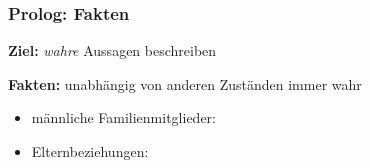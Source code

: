 \documentclass{beamer}
\begin{document}
\begin{frame}[fragile] \frametitle{Prolog: Fakten}
	\footnotesize
	
	\textbf{Ziel:} \textit{wahre} Aussagen beschreiben
	
	
	\textbf{Fakten:} unabhängig von anderen Zuständen immer wahr
	
	\begin{itemize}
		\item männliche Familienmitglieder: \pause
		
		\begin{minipage}[t]{\dimexpr0.5\linewidth-\fboxrule-\fboxsep}
			
		\end{minipage}
		\begin{minipage}[t]{\dimexpr0.5\linewidth-\fboxrule-\fboxsep}
			
		\end{minipage} \pause
		\item Elternbeziehungen: \pause
		
		\begin{minipage}[t]{\dimexpr0.5\linewidth-\fboxrule-\fboxsep}
			
		\end{minipage}
		\begin{minipage}[t]{\dimexpr0.5\linewidth-\fboxrule-\fboxsep}
			
		\end{minipage}
	\end{itemize}
\end{frame}
\end{document}
